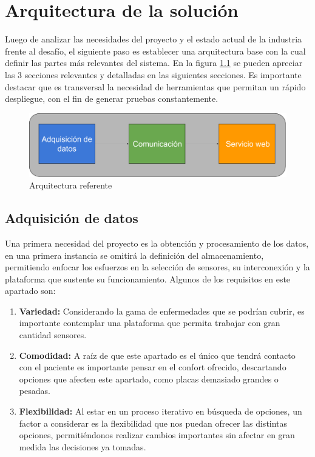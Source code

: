 \chapter{Arquitectura de la solución}\label{arquitectura}

Luego de analizar las necesidades del proyecto y el estado actual de la industria frente al desafío, el siguiente paso es establecer una arquitectura base con la cual definir las partes más relevantes del sistema. En la figura \ref{arqui} se pueden apreciar las 3 secciones relevantes y detalladas en las siguientes secciones. Es importante destacar que es transversal la necesidad de herramientas que permitan un rápido despliegue, con el fin de generar pruebas constantemente.

\begin{figure}[H]
	\centering
	\includegraphics[scale=0.43]{figuras/arquitectura/arqui.png}
	\caption{Arquitectura referente}
	\label{arqui}
\end{figure}

\newpage
\section{Adquisición de datos}
Una primera necesidad del proyecto es la obtención y procesamiento de los datos, en una primera instancia se omitirá la definición del almacenamiento, permitiendo enfocar los esfuerzos en la selección de sensores, su interconexión y la plataforma que sustente su funcionamiento. Algunos de los requisitos en este apartado son:

\begin{enumerate}
	\item \textbf{Variedad:}
	Considerando la gama de enfermedades que se podrían cubrir, es importante contemplar una plataforma que permita trabajar con gran cantidad sensores.
	\item \textbf{Comodidad:}
	A raíz de que este apartado es el único que tendrá contacto con el paciente es importante pensar en el confort ofrecido, descartando opciones que afecten este apartado, como placas demasiado grandes o pesadas.
	\item \textbf{Flexibilidad:}
	Al estar en un proceso iterativo en búsqueda de opciones, un factor a considerar es la flexibilidad que nos puedan ofrecer las distintas opciones, permitiéndonos realizar cambios importantes sin afectar en gran medida las decisiones ya tomadas.
\end{enumerate}

